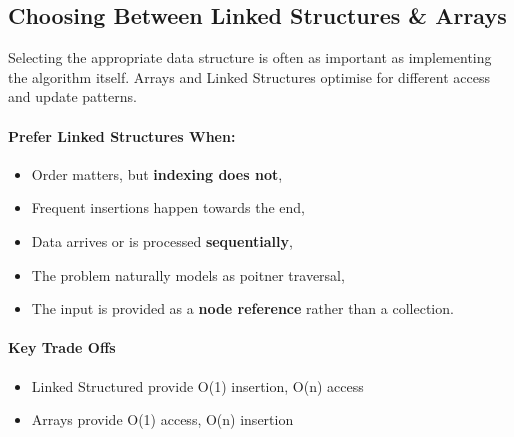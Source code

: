 \subsection*{Choosing Between Linked Structures \& Arrays}
Selecting the appropriate data structure is often as important as implementing the algorithm itself. 
Arrays and Linked Structures optimise for different access and update patterns. 

\paragraph{Prefer Linked Structures When:}
\begin{itemize}[nosep]
    \item Order matters, but \textbf{indexing does not},
    \item Frequent insertions happen towards the end,
    \item Data arrives or is processed \textbf{sequentially},
    \item The problem naturally models as poitner traversal,
    \item The input is provided as a \textbf{node reference} rather than a collection. 
\end{itemize}

\paragraph{Key Trade Offs}
\begin{itemize}[nosep]
    \item Linked Structured provide O(1) insertion, O(n) access
    \item Arrays provide O(1) access, O(n) insertion
\end{itemize}







